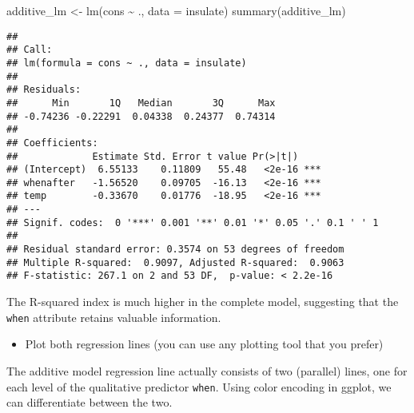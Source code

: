 \documentclass[
  oneside]{book}
\newenvironment{Shaded}{\begin{snugshade}}{\end{snugshade}}
\newcommand{\AttributeTok}[1]{\textcolor[rgb]{0.77,0.63,0.00}{#1}}
\newcommand{\FunctionTok}[1]{\textcolor[rgb]{0.00,0.00,0.00}{#1}}
\newcommand{\NormalTok}[1]{#1}
\newcommand{\OtherTok}[1]{\textcolor[rgb]{0.56,0.35,0.01}{#1}}
\newcommand{\SpecialCharTok}[1]{\textcolor[rgb]{0.00,0.00,0.00}{#1}}
\providecommand{\tightlist}{%
  \setlength{\itemsep}{0pt}\setlength{\parskip}{0pt}}
\begin{document}
\begin{Shaded}
\begin{Highlighting}[]
\NormalTok{additive\_lm }\OtherTok{\textless{}{-}} \FunctionTok{lm}\NormalTok{(cons }\SpecialCharTok{\textasciitilde{}}\NormalTok{ ., }\AttributeTok{data =}\NormalTok{ insulate)}
\FunctionTok{summary}\NormalTok{(additive\_lm)}
\end{Highlighting}
\end{Shaded}

\begin{verbatim}
## 
## Call:
## lm(formula = cons ~ ., data = insulate)
## 
## Residuals:
##      Min       1Q   Median       3Q      Max 
## -0.74236 -0.22291  0.04338  0.24377  0.74314 
## 
## Coefficients:
##             Estimate Std. Error t value Pr(>|t|)    
## (Intercept)  6.55133    0.11809   55.48   <2e-16 ***
## whenafter   -1.56520    0.09705  -16.13   <2e-16 ***
## temp        -0.33670    0.01776  -18.95   <2e-16 ***
## ---
## Signif. codes:  0 '***' 0.001 '**' 0.01 '*' 0.05 '.' 0.1 ' ' 1
## 
## Residual standard error: 0.3574 on 53 degrees of freedom
## Multiple R-squared:  0.9097, Adjusted R-squared:  0.9063 
## F-statistic: 267.1 on 2 and 53 DF,  p-value: < 2.2e-16
\end{verbatim}

The R-squared index is much higher in the complete model,
suggesting that the \texttt{when} attribute retains valuable information.

\begin{itemize}
\tightlist
\item
  Plot both regression lines (you can use any plotting
  tool that you prefer)
\end{itemize}

The additive model regression line actually consists of two (parallel)
lines, one for each level of the qualitative predictor \texttt{when}.
Using color encoding in ggplot, we can differentiate between the two.
\end{document}
